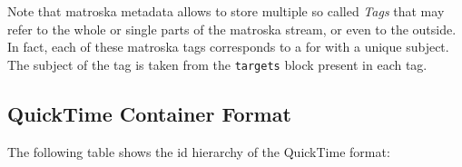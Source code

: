 
Note that matroska metadata allows to store multiple so called \emph{Tags} that may refer to the whole or single parts of the matroska stream, or even to the outside. In fact, each of these matroska tags corresponds to a \TERMtag{} for \LibName{} with a unique subject. The subject of the tag is taken from the \texttt{targets} block present in each tag.


\subsection{QuickTime Container Format}
\label{sec:QuickTimeContainerFormats}

The following table shows the id hierarchy of the QuickTime format:

